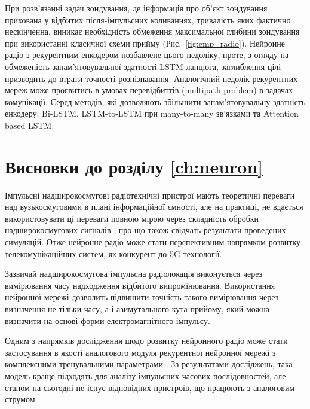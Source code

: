 При розв'язанні задач зондування, де інформація про об'єкт зондування 
прихована у відбитих після-імпульсних коливаннях, тривалість яких фактично 
нескінченна, виникає необхідність обмеження максимальної глибини зондування 
при використанні класичної схеми прийму (Рис.~\ref{fig:emp_radio}).
Нейронне радіо з рекурентним енкодером позбавлене цього недоліку, проте, з 
огляду на обмеженість запам'ятовувальної здатності LSTM ланцюга,
заглиблення цілі призводить до втрати точності розпізнавання. Аналогічний 
недолік рекурентних мереж може проявитись в умовах перевідбиттів (multipath 
problem) в задачах комунікації. Серед методів, які дозволяють збільшити 
запам'ятовувальну здатність енкодеру: Bi-LSTM, LSTM-to-LSTM при 
many-to-many зв'язками та Attention based LSTM.



\section*{Висновки до розділу \ref{ch:neuron}}

Імпульсні надширокосмугові радіотехнічні пристрої мають теоретичні переваги 
над вузькосмуговими в плані інформаційної ємності, але на практиці, не 
вдається використовувати ці переваги повною мірою через складність обробки 
надширокосмугових сигналів \cite{imp:ChannelLimitations}, про що також 
свідчать результати проведених симуляцій. Отже нейронне радіо може стати 
перспективним напрямком розвитку телекомунікаційних систем, як
конкурент до 5G технології.

Зазвичай надширокосмугова імпульсна радіолокація виконується 
через вимірювання часу надходження відбитого випромінювання. Використання 
нейронної мережі дозволить підвищити точність такого вимірювання через 
визначення не тільки часу, а і азимутального кута прийому, який можна 
визначити на основі форми електромагнітного імпульсу.

Одним з напрямків дослідження щодо розвитку нейронного радіо може стати
застосування в якості аналогового модуля рекурентної нейронної мережі з 
комплексними тренувальними параметрами \cite{imp:NIPS2018}. За результатами 
досліджень, така модель краще підходять для аналізу імпульсних часових 
послідовностей, але станом на сьогодні не існує відповідних пристроїв, що 
працюють з аналоговим струмом.

